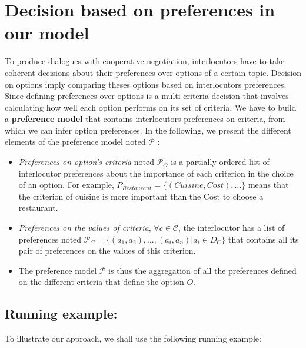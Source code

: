 \documentclass{llncs}
\begin{document}
\section{Decision based on preferences in our model}
\par To produce  dialogues with cooperative negotiation, interlocutors have to take coherent decisions about their preferences over options of a certain topic. Decision on options imply comparing theses options based on interlocutors preferences.  
 Since defining preferences over options is a multi criteria decision that involves calculating how well each option performs on its set of criteria. We have to build a \textbf{preference model }that contains interlocutors preferences on criteria, from which we can infer option preferences.  
In the following, we present the different elements of the preference model noted \textbf{$\mathcal{P}$} : 
\begin{itemize}
	\item \textit{Preferences on option's criteria} noted $\mathcal{P}_O$ is a partially ordered list of interlocutor preferences about the importance of each criterion in the choice of an option. For example, $ P_{Restaurant} = \{(Cuisine, Cost), \ldots\} $
	means that the criterion of cuisine is more important than the Cost to choose a restaurant. 
	\item  \textit{Preferences on the values of criteria}, $\forall c \in \mathcal{C}$, the interlocutor has a list of preferences noted $\mathcal{P}_C = \{(a_1, a_2), ..., (a_i,a_n) | a_i \in D_C \}$ that contains all its pair of preferences on the values of this criterion. 
	\item The preference model \textbf{$\mathcal{P}$} is thus the aggregation of all the preferences defined on the different criteria that define the option $O$. 

\end{itemize}
 \subsection{Running example:} 
 To illustrate our approach, we shall use the following running example:
 
\end{document}
